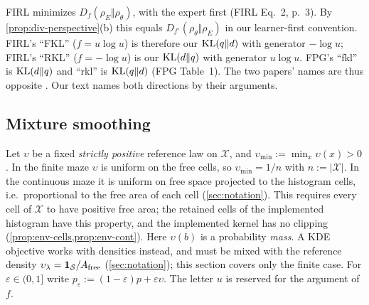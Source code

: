 \begin{corollary}\label{cor:div-dictionary}
FIRL minimizes $D_f(\rho_E\Vert\rho_\theta)$, with the expert first (FIRL Eq.~2, p.~3). By \cref{prop:div-perspective}(b) this equals $D_{f^\circ}(\rho_\theta\Vert\rho_E)$ in our learner-first convention.
FIRL's ``FKL'' ($f=u\log u$) is therefore our $\mathrm{KL}(q\Vert d)$ with generator $-\log u$; FIRL's ``RKL'' ($f=-\log u$) is our $\mathrm{KL}(d\Vert q)$ with generator $u\log u$.
FPG's ``fkl'' is $\mathrm{KL}(d\Vert q)$ and ``rkl'' is $\mathrm{KL}(q\Vert d)$ (FPG Table~1).
The two papers' names are thus opposite . Our text names both directions by their arguments.
\end{corollary}

\subsection{Mixture smoothing}\label{sec:div-smoothing}

Let $\upsilon$ be a fixed \emph{strictly positive} reference law on $\mathcal X$, and $\upsilon_{\min}:=\min_x\upsilon(x)>0$.
In the finite maze $\upsilon$ is uniform on the free cells, so $\upsilon_{\min}=1/n$ with $n:=|\mathcal X|$.
In the continuous maze it is uniform on free space projected to the histogram cells, i.e.\ proportional to the free area of each cell (\cref{sec:notation}).
This requires every cell of $\mathcal X$ to have positive free area; the retained cells of the implemented histogram have this property, and the implemented kernel has no clipping (\cref{prop:env-cells,prop:env-cont}).
Here $\upsilon(b)$ is a probability \emph{mass}. A KDE objective works with densities instead, and must be mixed with the reference density $\upsilon_\lambda=\mathbf{1}_{\mathcal{S}}/A_{\mathrm{free}}$ (\cref{sec:notation}); this section covers only the finite case.
For $\varepsilon\in(0,1]$ write $p_\varepsilon:=(1-\varepsilon)p+\varepsilon\upsilon$.
The letter $u$ is reserved for the argument of $f$.

